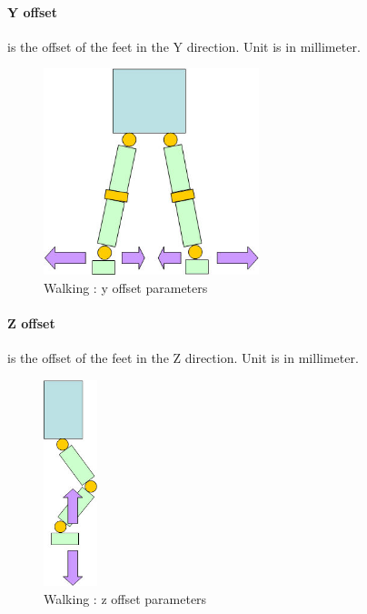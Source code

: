\documentclass[a4paper, 12pt]{article}  		%
\begin{document}
\paragraph*{Y offset}
is the offset of the feet in the Y direction. Unit is in millimeter.
\begin{figure}[H]
\begin{center}
\includegraphics[height=6cm]{y_offset.jpg}
\caption{Walking : y offset parameters}
\label{y_offset}
\end{center}
\end{figure}

\newpage
\paragraph*{Z offset}
is the offset of the feet in the Z direction. Unit is in millimeter.
\begin{figure}[H]
\begin{center}
\includegraphics[height=6cm]{z_offset.jpg}
\caption{Walking : z offset parameters}
\label{z_offset}
\end{center}
\end{figure}
\end{document}
